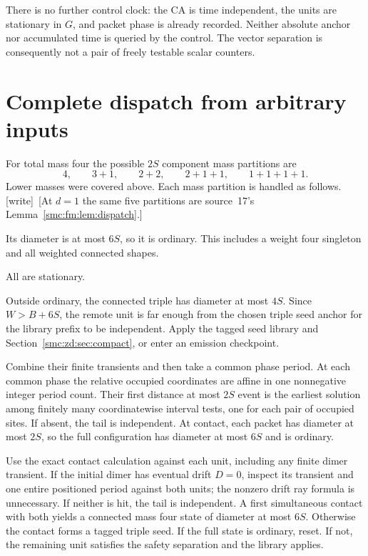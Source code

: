\documentclass[11pt,letterpaper]{article}
\numberwithin{equation}{section}
\theoremstyle{definition}
\theoremstyle{remark}
\newcommand{\wtag}{\textup{[write]}}
\begin{document}
There is no further control clock: the CA is time independent, the units are stationary in $G$, and packet phase is already recorded. Neither absolute anchor nor accumulated time is queried by the control. The vector separation is consequently not a pair of freely testable scalar counters.

\section{Complete dispatch from arbitrary inputs}\label{smc:zd:sec:dispatch}
For total mass four the possible $2S$ component mass partitions are
\[
 4,\qquad 3+1,\qquad 2+2,\qquad 2+1+1,\qquad 1+1+1+1.
\]
Lower masses were covered above. Each mass partition is handled as follows. \wtag\ [At $d=1$ the same five partitions are source~17's Lemma~\ref{smc:fm:lem:dispatch}.]

\begin{description}[style=nextline,leftmargin=0pt,labelsep=0pt]
\item[Connected mass four] Its diameter is at most $6S$, so it is ordinary. This includes a weight four singleton and all weighted connected shapes.
\item[Four unit components] All are stationary.
\item[Mass three plus one] Outside ordinary, the connected triple has diameter at most $4S$. Since $W>B+6S$, the remote unit is far enough from the chosen triple seed anchor for the library prefix to be independent. Apply the tagged seed library and Section~\ref{smc:zd:sec:compact}, or enter an emission checkpoint.
\item[Two dimers] Combine their finite transients and then take a common phase period. At each common phase the relative occupied coordinates are affine in one nonnegative integer period count. Their first distance at most $2S$ event is the earliest solution among finitely many coordinatewise interval tests, one for each pair of occupied sites. If absent, the tail is independent. At contact, each packet has diameter at most $2S$, so the full configuration has diameter at most $6S$ and is ordinary.
\item[A dimer and two units] Use the exact contact calculation against each unit, including any finite dimer transient. If the initial dimer has eventual drift $D=0$, inspect its transient and one entire positioned period against both units; the nonzero drift ray formula is unnecessary. If neither is hit, the tail is independent. A first simultaneous contact with both yields a connected mass four state of diameter at most $6S$. Otherwise the contact forms a tagged triple seed. If the full state is ordinary, reset. If not, the remaining unit satisfies the safety separation and the library applies.
\end{description}
\end{document}

